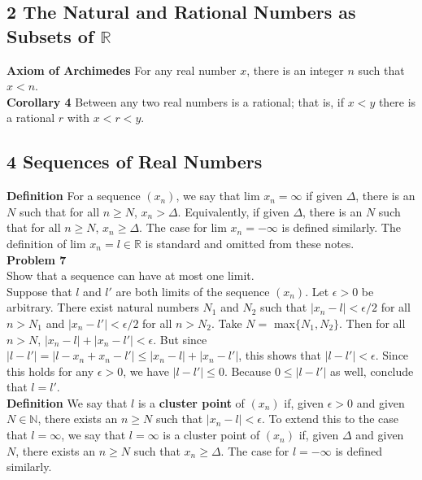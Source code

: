 \documentclass[a4paper]{article}
\begin{document}
\subsection*{2 The Natural and Rational Numbers as Subsets of $\mathbb{R}$}

{\bf Axiom of Archimedes} For any real number $x$, there is an integer $n$ such that $x<n$.\\

{\bf Corollary 4} Between any two real numbers is a rational; that is, if $x<y$ there is a rational $r$ with $x<r<y$. \\

\subsection*{4 Sequences of Real Numbers}

{\bf Definition} For a sequence $(x_n)$, we say that lim $x_n = \infty$ if given $\Delta$, there is an $N$ such that for all $n\geq N$, $x_n > \Delta$. Equivalently, if given $\Delta$, there is an $N$ such that for all $n\geq N$, $x_n \geq \Delta$. The case for lim $x_n = -\infty$ is defined similarly. The definition of lim $x_n = l \in \mathbb{R}$ is standard and omitted from these notes. \\

{\bf Problem 7}\\
Show that a sequence can have at most one limit.\\

Suppose that $l$ and $l'$ are both limits of the sequence $(x_n)$. Let $\epsilon > 0$ be arbitrary. There exist natural numbers $N_1$ and $N_2$ such that $|x_n -l| < \epsilon / 2$ for all $n > N_1$ and $|x_n - l'| < \epsilon / 2$ for all $n > N_2$. Take $N = $ max$\{N_1,N_2\}$. Then for all $n > N$, $|x_n - l| + |x_n - l'| < \epsilon$. But since $|l - l'| = |l - x_n + x_n - l'| \leq |x_n - l| + |x_n - l'|$, this shows that $|l-l'| < \epsilon$. Since this holds for any $\epsilon >0$, we have $|l - l'| \leq 0$. Because  $0\leq |l-l'|$ as well, conclude that $l =l'$. \\

{\bf Definition} We say that $l$ is a {\bf cluster point} of $(x_n)$ if, given $\epsilon > 0$ and given $N \in \mathbb{N}$, there exists an $n \geq N$ such that $|x_n - l| < \epsilon$. To extend this to the case that $l = \infty$, we say that $l = \infty$ is a cluster point of $(x_n)$ if, given $\Delta$ and given $N$, there exists an $n \geq N$ such that $x_n \geq \Delta$. The case for $l= -\infty$ is defined similarly. \\
\end{document}
